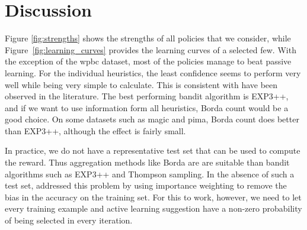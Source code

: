 \documentclass[fleqn,10pt,lineno]{wlpeerj} %
\begin{document}
\section*{Discussion}

Figure \ref{fig:strengths} shows the strengths of all policies that we
consider, while Figure~\ref{fig:learning_curves} provides the learning curves
of a selected few. With the exception of the wpbc dataset, most of the policies
manage to beat passive learning. For the individual heuristics, the least
confidence seems to perform very well while being very simple to calculate.
This is consistent with have been observed in the literature. The best
performing bandit algorithm is EXP3++, and if we want to use information form
all heuristics, Borda count would be a good choice. On some datasets such as
magic and pima, Borda count does better than EXP3++, although the effect is
fairly small.

In practice, we do not have a representative test set that can be used to
compute the reward. Thus aggregation methods like Borda are are suitable than
bandit algorithms such as EXP3++ and Thompson sampling. In the absence of such a
test set, \cite{hsu15} addressed this problem by using importance weighting to
remove the bias in the accuracy on the training set. For this to work, however,
we need to let every training example and active learning suggestion have a
non-zero probability of being selected in every iteration.
\end{document}
